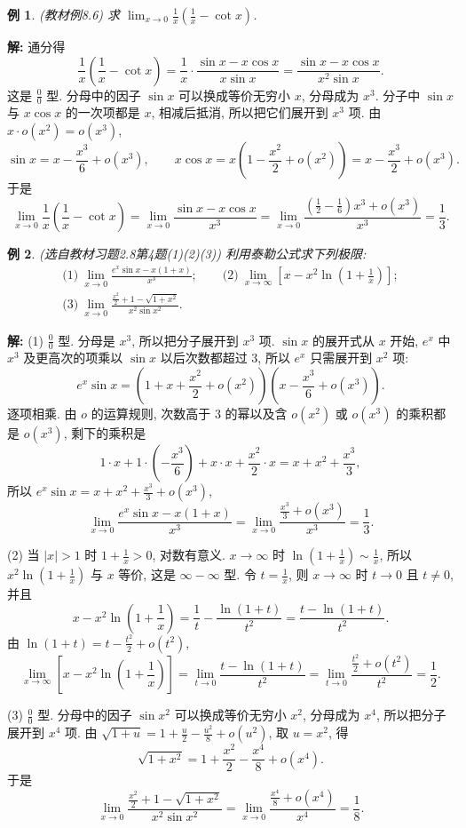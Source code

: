\documentclass[UTF8,openany]{ctexbook}
\theoremstyle{chinesetextbook}
\newtheorem{example}{例}[section]
\newenvironment{cnsolution}{\par\indent\textbf{解:} \ignorespaces}{\par}
\begin{document}
\begin{example}\label{ex:c2-8-6}
\textnormal{(教材例8.6)} 求 $\displaystyle\lim_{x\to0}\frac1x\left(\frac1x-\cot x\right)$.
\end{example}
\begin{cnsolution}
通分得
\[
\frac1x\left(\frac1x-\cot x\right)=\frac1x\cdot\frac{\sin x-x\cos x}{x\sin x}=\frac{\sin x-x\cos x}{x^2\sin x}.
\]
这是 $\displaystyle\frac00$ 型. 分母中的因子 $\sin x$ 可以换成等价无穷小 $x$, 分母成为 $x^3$. 分子中 $\sin x$ 与 $x\cos x$ 的一次项都是 $x$, 相减后抵消, 所以把它们展开到 $x^3$ 项. 由 $x\cdot o(x^2)=o(x^3)$,
\[
\sin x=x-\frac{x^3}6+o(x^3),\qquad x\cos x=x\left(1-\frac{x^2}2+o(x^2)\right)=x-\frac{x^3}2+o(x^3).
\]
于是
\[
\lim_{x\to0}\frac1x\left(\frac1x-\cot x\right)=\lim_{x\to0}\frac{\sin x-x\cos x}{x^3}=\lim_{x\to0}\frac{\left(\frac12-\frac16\right)x^3+o(x^3)}{x^3}=\frac13.
\]
\end{cnsolution}
\begin{example}\label{ex:c2-h8-4}
\textnormal{(选自教材习题2.8第4题(1)(2)(3))} 利用泰勒公式求下列极限:
\[
\begin{gathered}
\text{(1)}\ \lim_{x\to0}\frac{e^x\sin x-x(1+x)}{x^3};\qquad\text{(2)}\ \lim_{x\to\infty}\left[x-x^2\ln\left(1+\frac1x\right)\right];\\
\text{(3)}\ \lim_{x\to0}\frac{\frac{x^2}2+1-\sqrt{1+x^2}}{x^2\sin x^2}.
\end{gathered}
\]
\end{example}
\begin{cnsolution}
(1) $\displaystyle\frac00$ 型. 分母是 $x^3$, 所以把分子展开到 $x^3$ 项. $\sin x$ 的展开式从 $x$ 开始, $e^x$ 中 $x^3$ 及更高次的项乘以 $\sin x$ 以后次数都超过 $3$, 所以 $e^x$ 只需展开到 $x^2$ 项:
\[
e^x\sin x=\left(1+x+\frac{x^2}2+o(x^2)\right)\left(x-\frac{x^3}6+o(x^3)\right).
\]
逐项相乘. 由 $o$ 的运算规则, 次数高于 $3$ 的幂以及含 $o(x^2)$ 或 $o(x^3)$ 的乘积都是 $o(x^3)$, 剩下的乘积是
\[
1\cdot x+1\cdot\left(-\frac{x^3}6\right)+x\cdot x+\frac{x^2}2\cdot x=x+x^2+\frac{x^3}3,
\]
所以 $\displaystyle e^x\sin x=x+x^2+\frac{x^3}3+o(x^3)$,
\[
\lim_{x\to0}\frac{e^x\sin x-x(1+x)}{x^3}=\lim_{x\to0}\frac{\frac{x^3}3+o(x^3)}{x^3}=\frac13.
\]

(2) 当 $|x|>1$ 时 $\displaystyle1+\frac1x>0$, 对数有意义. $x\to\infty$ 时 $\displaystyle\ln\left(1+\frac1x\right)\sim\frac1x$, 所以 $\displaystyle x^2\ln\left(1+\frac1x\right)$ 与 $x$ 等价, 这是 $\infty-\infty$ 型. 令 $\displaystyle t=\frac1x$, 则 $x\to\infty$ 时 $t\to0$ 且 $t\ne0$, 并且
\[
x-x^2\ln\left(1+\frac1x\right)=\frac1t-\frac{\ln(1+t)}{t^2}=\frac{t-\ln(1+t)}{t^2}.
\]
由 $\displaystyle\ln(1+t)=t-\frac{t^2}2+o(t^2)$,
\[
\lim_{x\to\infty}\left[x-x^2\ln\left(1+\frac1x\right)\right]=\lim_{t\to0}\frac{t-\ln(1+t)}{t^2}=\lim_{t\to0}\frac{\frac{t^2}2+o(t^2)}{t^2}=\frac12.
\]

(3) $\displaystyle\frac00$ 型. 分母中的因子 $\sin x^2$ 可以换成等价无穷小 $x^2$, 分母成为 $x^4$, 所以把分子展开到 $x^4$ 项. 由 $\displaystyle\sqrt{1+u}=1+\frac u2-\frac{u^2}8+o(u^2)$, 取 $u=x^2$, 得
\[
\sqrt{1+x^2}=1+\frac{x^2}2-\frac{x^4}8+o(x^4).
\]
于是
\[
\lim_{x\to0}\frac{\frac{x^2}2+1-\sqrt{1+x^2}}{x^2\sin x^2}=\lim_{x\to0}\frac{\frac{x^4}8+o(x^4)}{x^4}=\frac18.
\]
\end{cnsolution}
\end{document}
